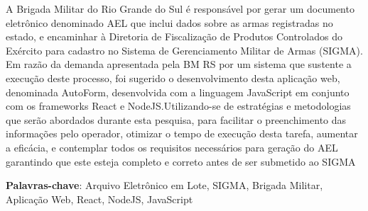 \setlength{\absparsep}{18pt} %
\begin{resumo}
	A Brigada Militar do Rio Grande do Sul é responsável por gerar um documento eletrônico denominado AEL que inclui dados sobre as armas registradas no estado, e encaminhar à Diretoria de Fiscalização de Produtos Controlados do Exército para cadastro no Sistema de Gerenciamento Militar de Armas (SIGMA). Em razão da demanda apresentada
	pela BM RS por um sistema que sustente a execução deste processo, foi sugerido o desenvolvimento desta aplicação web, denominada AutoForm, desenvolvida com a linguagem JavaScript
	em conjunto com os frameworks React e NodeJS.Utilizando-se de estratégias e metodologias
	que serão abordados durante esta pesquisa, para facilitar o preenchimento das informações pelo
	operador, otimizar o tempo de execução desta tarefa, aumentar a eficácia, e contemplar todos os
	requisitos necessários para geração do AEL garantindo que este esteja completo e correto antes
	de ser submetido ao SIGMA

	
	\textbf{Palavras-chave}: Arquivo Eletrônico em Lote, SIGMA, Brigada Militar, Aplicação Web, React, NodeJS,  JavaScript  %
\end{resumo}